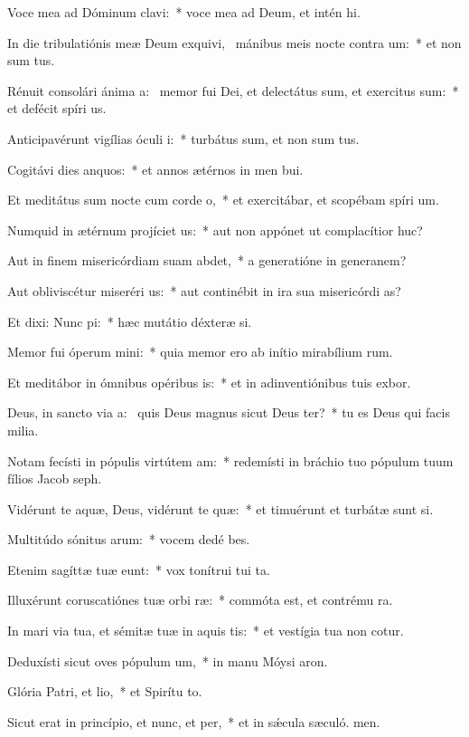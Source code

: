 \item Voce mea ad Dóminum clavi:~* voce mea ad Deum, et intén hi.
\item In die tribulatiónis meæ Deum exquivi,~\pscross{} mánibus meis nocte contra um:~* et non sum tus.
\item Rénuit consolári ánima a:~\pscross{} memor fui Dei, et delectátus sum, et exercitus sum:~* et defécit spíri us.
\item Anticipavérunt vigílias óculi i:~* turbátus sum, et non sum tus.
\item Cogitávi dies anquos:~* et annos ætérnos in men bui.
\item Et meditátus sum nocte cum corde o,~* et exercitábar, et scopébam spíri um.
\item Numquid in ætérnum projíciet us:~* aut non appónet ut complacítior  huc?
\item Aut in finem misericórdiam suam abdet,~* a generatióne in generanem?
\item Aut obliviscétur miseréri us:~* aut continébit in ira sua misericórdi as?
\item Et dixi: Nunc pi:~* hæc mutátio déxteræ si.
\item Memor fui óperum mini:~* quia memor ero ab inítio mirabílium rum.
\item Et meditábor in ómnibus opéribus is:~* et in adinventiónibus tuis exbor.
\item Deus, in sancto via a:~\pscross{} quis Deus magnus sicut Deus ter?~* tu es Deus qui facis milia.
\item Notam fecísti in pópulis virtútem am:~* redemísti in bráchio tuo pópulum tuum fílios Jacob  seph.
\item Vidérunt te aquæ, Deus, vidérunt te quæ:~* et timuérunt et turbátæ sunt si.
\item Multitúdo sónitus arum:~* vocem dedé bes.
\item Etenim sagíttæ tuæ eunt:~* vox tonítrui tui  ta.
\item Illuxérunt coruscatiónes tuæ orbi ræ:~* commóta est, et contrému ra.
\item In mari via tua, et sémitæ tuæ in aquis tis:~* et vestígia tua non cotur.
\item Deduxísti sicut oves pópulum um,~* in manu Móysi  aron.
\item Glória Patri, et lio,~* et Spirítu to.
\item Sicut erat in princípio, et nunc, et per,~* et in sǽcula sæculó. men.
